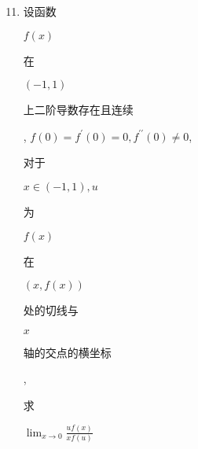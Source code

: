 \documentclass[10pt]{article}
\begin{document}
\begin{enumerate}
  \setcounter{enumi}{10}
  \item \begin{CJK}{UTF8}{mj}设函数\end{CJK} $f(x)$ \begin{CJK}{UTF8}{mj}在\end{CJK} $(-1,1)$ \begin{CJK}{UTF8}{mj}上二阶导数存在且连续\end{CJK}, $f(0)=f^{\prime}(0)=0, f^{\prime \prime}(0) \neq 0$, \begin{CJK}{UTF8}{mj}对于\end{CJK} $x \in(-1,1), u$ \begin{CJK}{UTF8}{mj}为\end{CJK} $f(x)$ \begin{CJK}{UTF8}{mj}在\end{CJK} $(x, f(x))$ \begin{CJK}{UTF8}{mj}处的切线与\end{CJK} $x$ \begin{CJK}{UTF8}{mj}轴的交点的横坐标\end{CJK}, \begin{CJK}{UTF8}{mj}求\end{CJK} $\lim _{x \rightarrow 0} \frac{u f(x)}{x f(u)}$
\end{enumerate}
\end{document}
